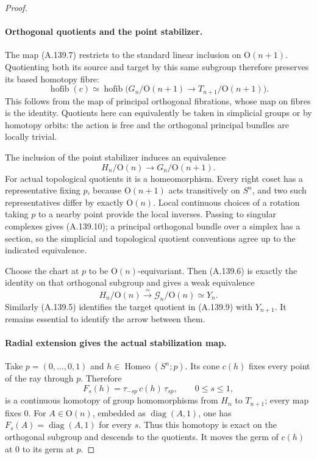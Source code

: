 \begin{proof}
\paragraph{Orthogonal quotients and the point stabilizer.}
The map (A.139.7) restricts to the standard linear inclusion on
$\mathrm O(n+1)$. Quotienting both its source and target by this
same subgroup therefore preserves its based homotopy fibre:
\[
 \operatorname{hofib}(c)\simeq
 \operatorname{hofib}\bigl(
 G_n/\mathrm O(n+1)\longrightarrow
 T_{n+1}/\mathrm O(n+1)\bigr).                          \tag{A.139.9}
\]
This follows from the map of principal orthogonal fibrations,
whose map on fibres is the identity. Quotients here can equivalently
be taken in simplicial groups or by homotopy orbits: the action is
free and the orthogonal principal bundles are locally trivial.

The inclusion of the point stabilizer induces an equivalence
\[
 H_n/\mathrm O(n)\longrightarrow G_n/\mathrm O(n+1).
                                                               \tag{A.139.10}
\]
For actual topological quotients it is a homeomorphism. Every right
coset has a representative fixing $p$, because $\mathrm O(n+1)$
acts transitively on $S^n$, and two such representatives differ
by exactly $\mathrm O(n)$. Local continuous choices of a rotation
taking $p$ to a nearby point provide the local inverses. Passing
to singular complexes gives (A.139.10); a principal orthogonal bundle
over a simplex has a section, so the simplicial and topological
quotient conventions agree up to the indicated equivalence.

Choose the chart at $p$ to be $\mathrm O(n)$-equivariant. Then
(A.139.6) is exactly the identity on that orthogonal subgroup and
gives a weak equivalence
\[
 H_n/\mathrm O(n)\xrightarrow{\simeq}
                \mathcal G_n/\mathrm O(n)\simeq Y_n.   \tag{A.139.11}
\]
Similarly (A.139.5) identifies the target quotient in (A.139.9) with
$Y_{n+1}$. It remains essential to identify the arrow between them.

\paragraph{Radial extension gives the actual stabilization map.}
Take $p=(0,\ldots,0,1)$ and $h\in\operatorname{Homeo}(S^n;p)$.
Its cone $c(h)$ fixes every point of the ray through $p$. Therefore
\[
 F_s(h)=\tau_{-sp}\,c(h)\,\tau_{sp},\qquad0\le s\le1,
                                                               \tag{A.139.12}
\]
is a continuous homotopy of group homomorphisms from $H_n$ to
$T_{n+1}$; every map fixes $0$. For $A\in\mathrm O(n)$,
embedded as $\operatorname{diag}(A,1)$, one has
$F_s(A)=\operatorname{diag}(A,1)$ for every $s$. Thus this homotopy
is exact on the orthogonal subgroup and descends to the quotients.
It moves the germ of $c(h)$ at $0$ to its germ at $p$.


\end{proof}
